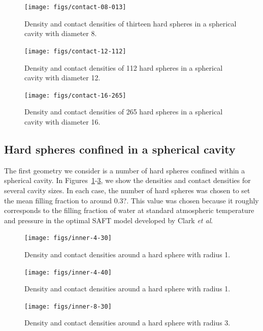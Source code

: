 \documentclass[letterpaper,twocolumn,amsmath,amssymb,jcp,10pt,aip]{revtex4-1}
\begin{document}
\begin{figure}
  \texttt{[image: figs/contact-08-013]}
  \caption{Density and contact densities of thirteen hard spheres in a
    spherical cavity with diameter 8. \sphereExplanation }
  \label{fig:sphere-8}
\end{figure}

\begin{figure}
  \texttt{[image: figs/contact-12-112]}
  \caption{Density and contact densities of 112 hard spheres in a
    spherical cavity with diameter 12.  \sphereExplanation}
  \label{fig:sphere-12}
\end{figure}

\begin{figure}
  \texttt{[image: figs/contact-16-265]}
  \caption{Density and contact densities of 265 hard spheres in a
    spherical cavity with diameter 16. \sphereExplanation}
  \label{fig:sphere-16}
\end{figure}

\subsection{Hard spheres confined in a spherical cavity}

The first geometry we consider is a number of hard spheres confined
within a spherical cavity.  In
Figures~\ref{fig:sphere-8}-\ref{fig:sphere-16}, we show
the densities and contact densities for several cavity sizes.  In each
case, the number of hard spheres was chosen to set the mean filling
fraction to around 0.3?.  This value was chosen because it roughly
corresponds to the filling fraction of water at standard atmospheric
temperature and pressure in the optimal SAFT model developed by Clark
\emph{et al}\cite{clark2006developing}.



\begin{figure}
  \texttt{[image: figs/inner-4-30]}
  \caption{Density and contact densities around a hard sphere with
    radius 1.}
  \label{fig:inner-4-30}
\end{figure}

\begin{figure}
  \texttt{[image: figs/inner-4-40]}
  \caption{Density and contact densities around a hard sphere with
    radius 1.}
  \label{fig:inner-4-40}
\end{figure}

\begin{figure}
  \texttt{[image: figs/inner-8-30]}
  \caption{Density and contact densities around a hard sphere with
    radius 3.}
  \label{fig:inner-8-30}
\end{figure}
\end{document}
